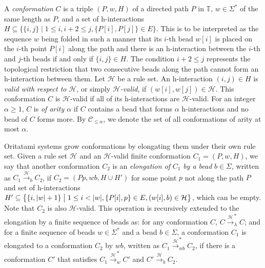 \documentclass[runningheads]{llncs}
\begin{document}
A \textit{conformation} $C$ is a triple $(P, w, H)$ of a directed path $P$ in $\mathbb{T}$, $w \in \Sigma^*$ of the same length as $P$, and a set of h-interactions $H \subseteq \{\{i,j\} \mid 1 \leq i, i+2 \leq j, \{P[i], P[j]\} \in E\}$.
This is to be interpreted as the sequence $w$ being folded in such a manner that its $i$-th bead $w[i]$ is placed on the $i$-th point $P[i]$ along the path and there is an h-interaction between the $i$-th and $j$-th beads if and only if $\{i, j\} \in H$. 
The condition $i+2 \leq j$ represents the topological restriction that two consecutive beads along the path cannot form an h-interaction between them.
Let $\mathcal{H}$ be a rule set. 
An h-interaction $(i, j) \in H$ is \textit{valid with respect to $\mathcal{H}$}, or simply \textit{$\mathcal{H}$-valid}, if $(w[i], w[j]) \in \mathcal{H}$. 
This conformation $C$ is $\mathcal{H}$-valid if all of its h-interactions are $\mathcal{H}$-valid. 
For an integer $\alpha \ge 1$, $C$ is \textit{of arity $\alpha$} if $C$ contains a bead that forms $\alpha$ h-interactions and no bead of $C$ forms more. 
By $\mathcal{C}_{\le \alpha}$, we denote the set of all conformations of arity at most $\alpha$.

Oritatami systems grow conformations by elongating them under their own rule set. 
Given a rule set $\mathcal{H}$ and an $\mathcal{H}$-valid finite conformation $C_1 = (P, w, H)$, 
we say that another conformation $C_2$ is an \textit{elongation of} $C_1$ \textit{by a bead} $b \in \Sigma$, written as $C_1 \xrightarrow{\mathcal{H}}_b C_2$, if $C_2 = (Pp, wb, H \cup H')$ for some point $p$ not along the path $P$ and set of h-interactions $H' \subseteq \left\{ \{i, |w|+1\} \bigm| 1\leq i < |w|, \{P[i], p\} \in E, (w[i], b) \in \mathcal{H}\right\}$, which can be empty.
Note that $C_2$ is also $\mathcal{H}$-valid.
This operation is recursively extended to the elongation by a finite sequence of beads as: 
for any conformation $C$, $C \xrightarrow{\mathcal{H}}^*_\lambda C$; 
and for a finite sequence of beads $w \in \Sigma^*$ and a bead $b \in \Sigma$,
a conformation $C_1$ is elongated to a conformation $C_2$ by $wb$,
written as $C_1 \xrightarrow{\mathcal{H}}^*_{wb} C_2$, if there is a conformation $C'$ that satisfies
$C_1 \xrightarrow{\mathcal{H}}^*_w C'$ and $C' \xrightarrow{\mathcal{H}}_b C_2$.
\end{document}
